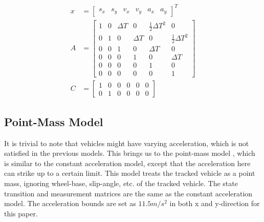 \begin{equation}
\label{formula:camodel}
\begin{split}
x&= \left[\begin{matrix}
s_x & s_y & v_x & v_y & a_x & a_y
\end{matrix}\right]^{T}\\
A&= \left[\begin{matrix}
1 & 0 & \Delta T & 0 & \frac{1}{2}\Delta T^2 & 0\\
0 & 1 & 0 & \Delta T & 0 & \frac{1}{2}\Delta T^2 \\
0 & 0 & 1 & 0 & \Delta T & 0\\
0 & 0 & 0 & 1 & 0 & \Delta T\\
0 & 0 & 0 & 0 & 1 & 0\\
0 & 0 & 0 & 0 & 0 & 1
\end{matrix}\right] \\
C&= \left[\begin{matrix}
1 & 0 & 0 & 0 & 0 & 0\\
0 & 1 & 0 & 0 & 0 & 0
\end{matrix}\right]
\end{split}
\end{equation}

\subsection{Point-Mass Model}
It is trivial to note that vehicles might have varying acceleration, which is not satisfied in the previous models. This brings us to the point-mass model \cite{Althoff}, which is similar to the constant acceleration model, except that the acceleration here can strike up to a certain limit. This model treats the tracked vehicle as a point mass, ignoring wheel-base, slip-angle, etc. of the tracked vehicle. The state transition and measurement matrices are the same as the constant acceleration model. The acceleration bounds are set as $11.5 m/s^2$ \cite{Althoff} in both x and y-direction for this paper.


